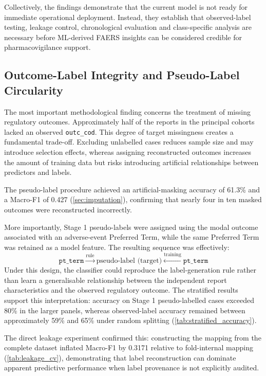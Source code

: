 \documentclass[10pt]{article}
\begin{document}
Collectively, the findings demonstrate that the current model is not ready for immediate operational deployment. Instead, they establish that observed-label testing, leakage control, chronological evaluation and class-specific analysis are necessary before ML-derived FAERS insights can be considered credible for pharmacovigilance support.

\subsection{Outcome-Label Integrity and Pseudo-Label Circularity}
The most important methodological finding concerns the treatment of missing regulatory outcomes. Approximately half of the reports in the principal cohorts lacked an observed \texttt{outc\_cod}. This degree of target missingness creates a fundamental trade-off. Excluding unlabelled cases reduces sample size and may introduce selection effects, whereas assigning reconstructed outcomes increases the amount of training data but risks introducing artificial relationships between predictors and labels.

The pseudo-label procedure achieved an artificial-masking accuracy of 61.3\% and a Macro-F1 of 0.427 (\cref{sec:imputation}), confirming that nearly four in ten masked outcomes were reconstructed incorrectly.

More importantly, Stage 1 pseudo-labels were assigned using the modal outcome associated with an adverse-event Preferred Term, while the same Preferred Term was retained as a model feature. The resulting sequence was effectively:
\begin{equation}
\texttt{pt\_term} \xrightarrow{\text{rule}} \text{pseudo-label (target)} \xleftarrow{\text{training}} \texttt{pt\_term}
\end{equation}
Under this design, the classifier could reproduce the label-generation rule rather than learn a generalisable relationship between the independent report characteristics and the observed regulatory outcome. The stratified results support this interpretation: accuracy on Stage 1 pseudo-labelled cases exceeded 80\% in the larger panels, whereas observed-label accuracy remained between approximately 59\% and 65\% under random splitting (\cref{tab:stratified_accuracy}).

The direct leakage experiment confirmed this: constructing the mapping from the complete dataset inflated Macro-F1 by 0.3171 relative to fold-internal mapping (\cref{tab:leakage_cv}), demonstrating that label reconstruction can dominate apparent predictive performance when label provenance is not explicitly audited.
\end{document}
